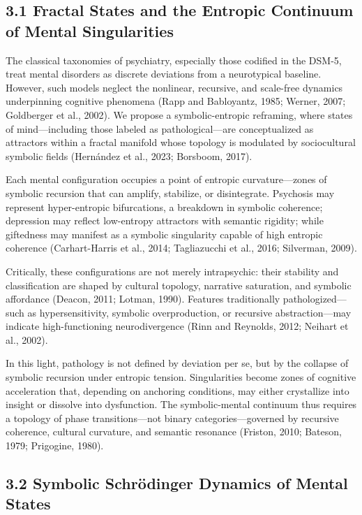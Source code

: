 \subsection*{3.1 Fractal States and the Entropic Continuum of Mental Singularities}

The classical taxonomies of psychiatry, especially those codified in the DSM-5, treat mental disorders as discrete deviations from a neurotypical baseline. However, such models neglect the nonlinear, recursive, and scale-free dynamics underpinning cognitive phenomena (Rapp and Babloyantz, 1985; Werner, 2007; Goldberger et al., 2002). We propose a symbolic-entropic reframing, where states of mind—including those labeled as pathological—are conceptualized as attractors within a fractal manifold whose topology is modulated by sociocultural symbolic fields (Hernández et al., 2023; Borsboom, 2017).

Each mental configuration occupies a point of entropic curvature—zones of symbolic recursion that can amplify, stabilize, or disintegrate. Psychosis may represent hyper-entropic bifurcations, a breakdown in symbolic coherence; depression may reflect low-entropy attractors with semantic rigidity; while giftedness may manifest as a symbolic singularity capable of high entropic coherence (Carhart-Harris et al., 2014; Tagliazucchi et al., 2016; Silverman, 2009).

Critically, these configurations are not merely intrapsychic: their stability and classification are shaped by cultural topology, narrative saturation, and symbolic affordance (Deacon, 2011; Lotman, 1990). Features traditionally pathologized—such as hypersensitivity, symbolic overproduction, or recursive abstraction—may indicate high-functioning neurodivergence (Rinn and Reynolds, 2012; Neihart et al., 2002).

In this light, pathology is not defined by deviation per se, but by the collapse of symbolic recursion under entropic tension. Singularities become zones of cognitive acceleration that, depending on anchoring conditions, may either crystallize into insight or dissolve into dysfunction. The symbolic-mental continuum thus requires a topology of phase transitions—not binary categories—governed by recursive coherence, cultural curvature, and semantic resonance (Friston, 2010; Bateson, 1979; Prigogine, 1980).

\subsection*{3.2 Symbolic Schrödinger Dynamics of Mental States}

